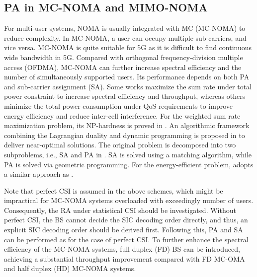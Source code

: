 \documentclass[10pt,final,journal,a4paper,twoside,twocolumn,romanappendices]{IEEEtran}
\theoremstyle{myremark}
\theoremstyle{myremark}
\begin{document}

\vspace{-0.2cm}
\subsection{PA in MC-NOMA and MIMO-NOMA}
For multi-user systems, NOMA is usually integrated with MC (MC-NOMA) to reduce
complexity. In MC-NOMA, {\color{black}a user can occupy multiple sub-carriers, and vice versa.} MC-NOMA is quite suitable for 5G as it is difficult
to find continuous wide bandwidth in 5G. Compared with orthogonal frequency-division multiple access (OFDMA), MC-NOMA can further increase spectral efficiency and the number of {\color{black}simultaneously supported} users. Its performance depends on both PA and sub-carrier assignment (SA). Some works maximize the sum rate under total power constraint to increase spectral efficiency and throughput, whereas others minimize the total power consumption under QoS requirements to improve energy efficiency and reduce inter-cell interference. {\color{black}For the weighted sum rate maximization problem, its NP-hardness is proved in \cite{31,30}. An algorithmic framework combining the Lagrangian duality and dynamic programming is proposed in \cite{31} to deliver near-optimal solutions. The original problem is decomposed into two subproblems, i.e., SA and PA in \cite{30}. SA is solved using a matching algorithm, while PA is solved via geometric programming. For the energy-efficient problem, \cite{32} adopts a similar approach as \cite{30}.} 

Note that perfect CSI is assumed in the above schemes, which might be impractical for MC-NOMA systems overloaded with exceedingly number of users. Consequently, the RA under statistical CSI should be investigated. Without perfect CSI, the BS cannot decide the SIC decoding order directly, and thus, an explicit SIC decoding order should be derived first. Following this, PA and SA can be performed as for the case of perfect CSI. To further enhance the spectral efficiency of the MC-NOMA systems, full duplex (FD) BS can be introduced, achieving a substantial throughput improvement compared with FD MC-OMA and half duplex (HD) MC-NOMA systems.
\end{document}
